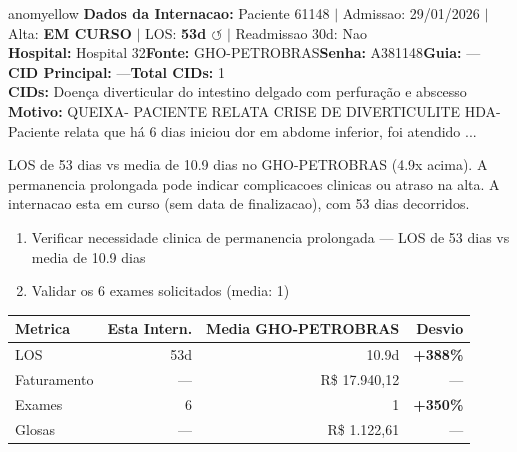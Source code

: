 \documentclass[a4paper,10pt]{article}
\begin{document}
\begin{anomalycard}[Internacao 164272 | GHO-PETROBRAS | MODERADO (z=2.31)]{anomyellow}
\textbf{Dados da Internacao:} Paciente 61148 $\mid$ Admissao: 29/01/2026 $\mid$ Alta: \textcolor{anomorange}{\textbf{EM CURSO}} $\mid$ LOS: \textbf{53d \textcolor{anomorange}{$\circlearrowleft$}} $\mid$ Readmissao 30d: Nao\\
\textbf{Hospital:} Hospital 32\quad\textbf{Fonte:} GHO-PETROBRAS\quad\textbf{Senha:} A381148\quad\textbf{Guia:} ---\\
\textbf{CID Principal:} {\small ---}\quad\textbf{Total CIDs:} 1\\

\textbf{CIDs:} {\scriptsize Doença diverticular do intestino delgado com perfuração e abscesso}\\

\textbf{Motivo:} {\scriptsize QUEIXA- PACIENTE RELATA CRISE DE DIVERTICULITE  HDA- Paciente relata que há 6 dias iniciou dor em abdome inferior, foi atendido ...}\\

\vspace{2pt}\begin{tcolorbox}[colback=severityred!20,colframe=anomyellow,title={\textbf{Interpretacao de Negocio}},fonttitle=\bfseries\small,left=4pt,right=4pt,top=3pt,bottom=3pt]
{\small LOS de 53 dias vs media de 10.9 dias no GHO-PETROBRAS (4.9x acima). A permanencia prolongada pode indicar complicacoes clinicas ou atraso na alta. A internacao esta em curso (sem data de finalizacao), com 53 dias decorridos.}
\end{tcolorbox}
\begin{tcolorbox}[colback=severityyellow!30,colframe=anomorange,title={\textbf{Recomendacoes Especificas}},fonttitle=\bfseries\small,left=4pt,right=4pt,top=3pt,bottom=3pt]
\begin{enumerate}[nosep,leftmargin=16pt]
\item {\small Verificar necessidade clinica de permanencia prolongada --- LOS de 53 dias vs media de 10.9 dias}
\item {\small Validar os 6 exames solicitados (media: 1)}
\end{enumerate}
\end{tcolorbox}
\begin{center}\begin{tabular}{l r r r}\toprule\textbf{Metrica} & \textbf{Esta Intern.} & \textbf{Media GHO-PETROBRAS} & \textbf{Desvio} \\\midrule
LOS & 53d & 10.9d & \textcolor{anomred}{\textbf{+388\%}} \\
Faturamento & --- & R\$ 17.940,12 & --- \\
Exames & 6 & 1 & \textcolor{anomred}{\textbf{+350\%}} \\
Glosas & --- & R\$ 1.122,61 & --- \\
\bottomrule\end{tabular}\end{center}


\end{anomalycard}
\end{document}

